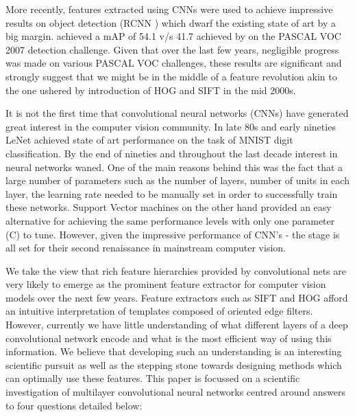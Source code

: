 \documentclass[runningheads]{llncs}
\begin{document}
More recently, features extracted using CNNs were used to achieve impressive results on object detection (RCNN \cite{Rcnn}) which dwarf the existing state of art by a big margin. \cite{Rcnn} achieved a mAP of 54.1 v/s 41.7 achieved by \cite{regionlets} on the PASCAL VOC 2007 detection challenge. Given that over the last few years, negligible progress was made on various PASCAL VOC challenges, these results are significant and strongly suggest that we might be in the middle of a feature revolution akin to the one ushered by introduction of HOG \cite{Hog} and SIFT \cite{Sift} in the mid 2000s.  

It is not the first time that convolutional neural networks (CNNs) have generated great interest in the computer vision community. In late 80s and early nineties LeNet \cite{Lecun89} achieved state of art performance on the task of MNIST digit classification. By the end of nineties and throughout the last decade interest in neural networks waned. One of the main reasons behind this was the fact that a large number of parameters such as the number of layers, number of units in each layer, the learning rate needed to be manually set in order to successfully train these networks. Support Vector machines on the other hand provided an easy alternative for achieving the same performance levels with only one parameter (C) to tune. However, given the impressive performance of CNN's - the stage is all set for their second renaissance in mainstream computer vision. 

We take the view that rich feature hierarchies provided by convolutional nets  are very likely to emerge as the prominent feature extractor for computer vision models over the next few years. Feature extractors such as SIFT and HOG afford an intuitive interpretation of templates composed of oriented edge filters. However, currently we have little understanding of what different layers of a deep convolutional network encode and what is the most efficient way of using this information. We believe that developing such an understanding is an interesting scientific pursuit as well as  the stepping stone towards designing methods which can optimally use these features.  
This paper is focussed on a scientific investigation of multilayer convolutional neural networks centred around answers to four questions detailed below:
\end{document}
